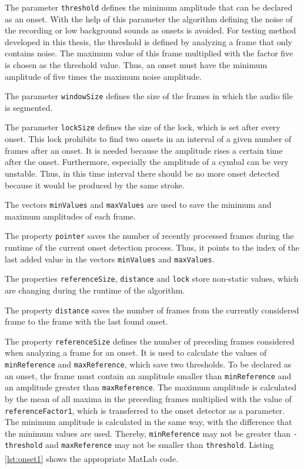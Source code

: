 The parameter \lstinline{threshold} defines the minimum amplitude that can be declared as an onset. With the help of this parameter the algorithm defining the noise of the recording or low background sounds as onsets is avoided. For testing method developed in this thesis, the threshold is defined by analyzing a frame that only contains noise. The maximum value of this frame multiplied with the factor five is chosen as the threshold value. Thus, an onset must have the minimum amplitude of five times the maximum noise amplitude.

The parameter \lstinline{windowSize} defines the size of the frames in which the audio file is segmented. 

The parameter \lstinline{lockSize} defines the size of the lock, which is set after every onset. This lock prohibits to find two onsets in an interval of a given number of frames after an onset. It is needed because the amplitude rises a certain time after the onset. Furthermore, especially the amplitude of a cymbal can be very unstable. Thus, in this time interval there should be no more onset detected because it would be produced by the same stroke. 

The vectors \lstinline{minValues} and \lstinline{maxValues} are used to save the minimum and maximum amplitudes of each frame. 

The property \lstinline{pointer} saves the number of recently processed frames during the runtime of the current onset detection process. Thus, it points to the index of the last added value in the vectors \lstinline{minValues} and \lstinline{maxValues}.

The properties \lstinline{referenceSize}, \lstinline{distance} and \lstinline{lock} store non-static values, which are changing during the runtime of the algorithm. 

The property \lstinline{distance} saves the number of frames from the currently considered frame to the frame with the last found onset. 

The property \lstinline{referenceSize} defines the number of preceding frames considered when analyzing a frame for an onset. It is used to calculate the values of \lstinline{minReference} and \lstinline{maxReference}, which save two thresholds. To be declared as an onset, the frame must contain an amplitude smaller than \lstinline{minReference} and an amplitude greater than \lstinline{maxReference}. The maximum amplitude is calculated by the mean of all maxima in the preceding frames multiplied with the value of \lstinline{referenceFactor1}, which is transferred to the onset detector as a parameter. The minimum amplitude is calculated in the same way, with the difference that the minimum values are used. Thereby, \lstinline{minReference} may not be greater than \lstinline{-threshold} and \lstinline{maxReference} may not be smaller than \lstinline{threshold}. Listing \ref{lst:onset1} shows the appropriate MatLab\textsuperscript{\textregistered} code.

